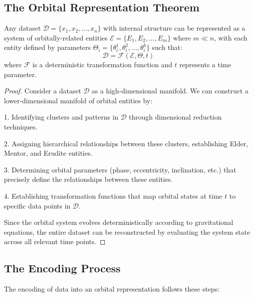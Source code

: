 \subsection{The Orbital Representation Theorem}

\begin{theorem}
Any dataset $\mathcal{D} = \{x_1, x_2, \ldots, x_n\}$ with internal structure can be represented as a system of orbitally-related entities $\mathcal{E} = \{E_1, E_2, \ldots, E_m\}$ where $m \ll n$, with each entity defined by parameters $\Theta_i = \{\theta_i^1, \theta_i^2, \ldots, \theta_i^k\}$ such that:
\begin{equation}
\mathcal{D} = \mathcal{F}(\mathcal{E}, \Theta, t)
\end{equation}
where $\mathcal{F}$ is a deterministic transformation function and $t$ represents a time parameter.
\end{theorem}

\begin{proof}
Consider a dataset $\mathcal{D}$ as a high-dimensional manifold. We can construct a lower-dimensional manifold of orbital entities by:

1. Identifying clusters and patterns in $\mathcal{D}$ through dimensional reduction techniques.

2. Assigning hierarchical relationships between these clusters, establishing Elder, Mentor, and Erudite entities.

3. Determining orbital parameters (phase, eccentricity, inclination, etc.) that precisely define the relationships between these entities.

4. Establishing transformation functions that map orbital states at time $t$ to specific data points in $\mathcal{D}$.

Since the orbital system evolves deterministically according to gravitational equations, the entire dataset can be reconstructed by evaluating the system state across all relevant time points.
\end{proof}

\subsection{The Encoding Process}

The encoding of data into an orbital representation follows these steps:

